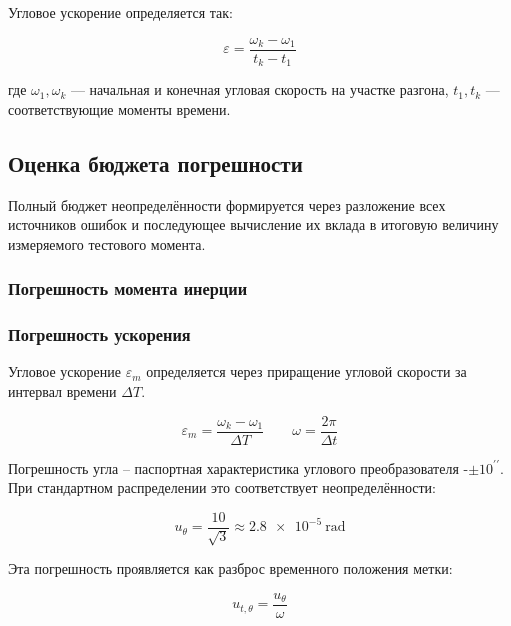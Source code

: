 Угловое ускорение определяется так:

\begin{equation}
	\label{eq:flyweel_acc}
	\varepsilon = \frac{\omega_k-\omega_1}{t_k-t_1}
\end{equation}

где \(\omega_1, \omega_k\) --- начальная и конечная угловая скорость на участке разгона, \(t_1, t_k\) --- соответствующие моменты времени.

\subsection{Оценка бюджета погрешности}

Полный бюджет неопределённости формируется через разложение всех источников ошибок и последующее вычисление их вклада в итоговую величину измеряемого тестового момента.

\subsubsection{Погрешность момента инерции}

\subsubsection{Погрешность ускорения}

Угловое ускорение $\varepsilon_m$ определяется через приращение угловой скорости за интервал времени $\Delta T$.

\begin{equation}
	\label{eq:acc_err}
	\varepsilon_m=\frac{\omega_k-\omega_1}{\Delta T} \quad \quad \omega = \frac{2 \pi}{\Delta t}
\end{equation}

Погрешность угла -- паспортная характеристика углового преобразователя -$\pm 10^{\prime\prime}$. При стандартном распределении это соответствует неопределённости:

\begin{equation}
	\label{eq:u_thtta}
	u_\theta = \frac{10}{\sqrt{3}} \approx \SI{2,8e-5}{\radian}
\end{equation}

Эта погрешность проявляется как разброс временного положения метки:

\begin{equation}
	\label{eq:u)_theta_t}
	u_{t, \theta} = \frac{u_\theta}{\omega}
\end{equation}

